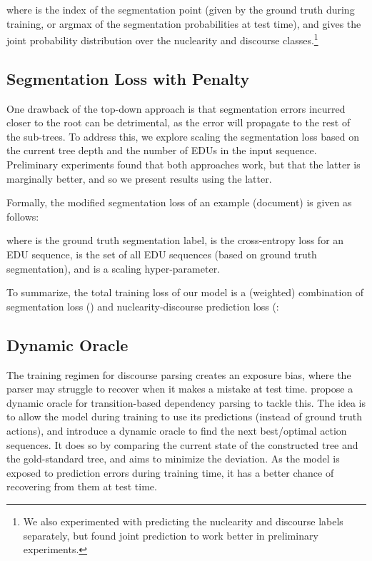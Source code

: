 \documentclass[11pt,a4paper]{article}
\begin{document}
where  is the index of the segmentation point (given by the ground
truth during training, or argmax of the segmentation probabilities
 at test time), and  gives the joint
probability distribution over the nuclearity and discourse classes.\footnote{We also experimented with predicting the nuclearity and discourse labels separately, but found joint prediction to work better in preliminary experiments.}






\subsection{Segmentation Loss with Penalty}
\label{sec:penalty}

One drawback of the top-down approach is that segmentation
errors incurred closer to the root can be detrimental, as the error will
propagate to the rest of the sub-trees. To address this, we explore
scaling the segmentation loss based on the current tree depth and the
number of EDUs in the input sequence. Preliminary experiments found that
both approaches work, but that the latter is marginally better, and so we
present results using the latter.





Formally, the modified segmentation loss of an example (document) is
given as follows:

where  is the ground truth segmentation label,
 is the cross-entropy loss for an EDU sequence,  is the
set of all EDU sequences (based on ground truth segmentation), and
 is a scaling hyper-parameter.

To summarize, the total training loss of our model is a (weighted)
combination of segmentation loss  () and
nuclearity-discourse prediction loss
(:



\subsection{Dynamic Oracle}
\label{sec:dynamic-oracle}


The training regimen for discourse parsing creates an exposure bias, where
the parser may struggle to recover when it makes a mistake at test time.
\citet{goldberg-nivre-2012-dynamic} propose a dynamic oracle for
transition-based dependency parsing to tackle this. The idea is to allow
the model during training to use its predictions (instead of ground
truth actions), and introduce a dynamic oracle to find the next
best/optimal action sequences.  It does so by comparing the current
state of the constructed tree and the gold-standard tree, and aims to
minimize the deviation. As the model is exposed to prediction errors
during training time, it has a better chance of recovering from them at
test time.
\end{document}
